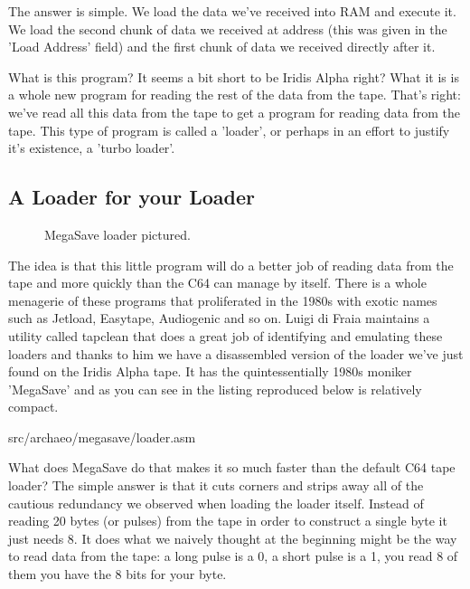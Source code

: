 The answer is simple. We load the data we've received into RAM and execute it. We load the second chunk of data
we received at address  (this was given in the 'Load Address' field) and the first chunk of data we received directly after it.

What is this program? It seems a bit short to be Iridis Alpha right? What it is is a whole new program for reading the
rest of the data from the tape. That's right: we've read all this data from the tape to get a program for reading data
from the tape. This type of program is called a 'loader', or perhaps in an effort to justify it's existence, a 'turbo loader'.

\subsection{A Loader for your Loader}
\begin{figure}[H]
  {
    \begin{adjustbox}{width=10cm,center}
    \end{adjustbox}
  }\caption[]{MegaSave loader pictured.}
\end{figure}

The idea is that this little program will do a better job of reading data from the tape and more quickly than the C64 can manage
by itself. There is a whole menagerie of these programs that proliferated in the 1980s with exotic names such as Jetload, Easytape,
Audiogenic and so on. Luigi di Fraia maintains a utility called tapclean that does a great job of identifying and emulating
these loaders and thanks to him we have a disassembled version of the loader we've just found on the Iridis Alpha tape. It has the
quintessentially 1980s moniker 'MegaSave' and as you can see in the listing reproduced below is relatively compact.


{src/archaeo/megasave/loader.asm}

What does MegaSave do that makes it so much faster than the default C64 tape loader? The simple answer is that it cuts corners
and strips away all of the cautious redundancy we observed when loading the loader itself. Instead of reading 20 bytes (or pulses)
from the tape in order to construct a single byte it just needs 8. It does what we naively thought at the beginning might be
the way to read data from the tape: a long pulse is a 0, a short pulse is a 1, you read 8 of them you have the 8 bits for your
byte.

